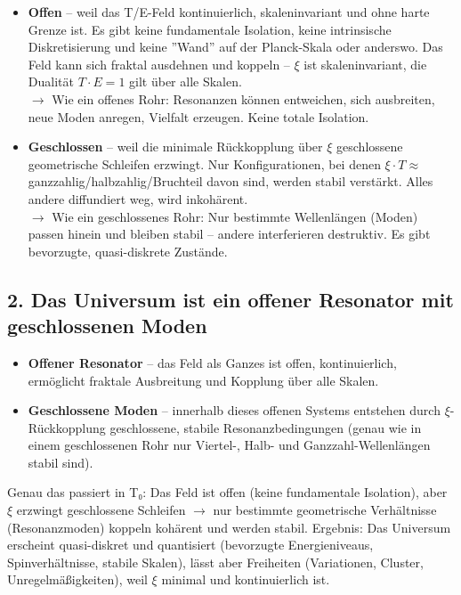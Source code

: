 \begin{itemize}[label=$\bullet$]
	\item \textbf{Offen} – weil das T/E-Feld kontinuierlich, skaleninvariant und ohne harte Grenze ist. Es gibt keine fundamentale Isolation, keine intrinsische Diskretisierung und keine ''Wand'' auf der Planck-Skala oder anderswo. Das Feld kann sich fraktal ausdehnen und koppeln – $\xi$ ist skaleninvariant, die Dualität $T \cdot E = 1$ gilt über alle Skalen. \\
	$\rightarrow$ Wie ein offenes Rohr: Resonanzen können entweichen, sich ausbreiten, neue Moden anregen, Vielfalt erzeugen. Keine totale Isolation.
	
	\item \textbf{Geschlossen} – weil die minimale Rückkopplung über $\xi$ geschlossene geometrische Schleifen erzwingt. Nur Konfigurationen, bei denen $\xi \cdot T \approx$ ganzzahlig/halbzahlig/Bruchteil davon sind, werden stabil verstärkt. Alles andere diffundiert weg, wird inkohärent. \\
	$\rightarrow$ Wie ein geschlossenes Rohr: Nur bestimmte Wellenlängen (Moden) passen hinein und bleiben stabil – andere interferieren destruktiv. Es gibt bevorzugte, quasi-diskrete Zustände.
\end{itemize}

\subsection*{2. Das Universum ist ein offener Resonator mit geschlossenen Moden}

\begin{itemize}[label=$\bullet$]
	\item \textbf{Offener Resonator} – das Feld als Ganzes ist offen, kontinuierlich, ermöglicht fraktale Ausbreitung und Kopplung über alle Skalen.
	\item \textbf{Geschlossene Moden} – innerhalb dieses offenen Systems entstehen durch $\xi$-Rückkopplung geschlossene, stabile Resonanzbedingungen (genau wie in einem geschlossenen Rohr nur Viertel-, Halb- und Ganzzahl-Wellenlängen stabil sind).
\end{itemize}

Genau das passiert in T₀: Das Feld ist offen (keine fundamentale Isolation), aber $\xi$ erzwingt geschlossene Schleifen $\rightarrow$ nur bestimmte geometrische Verhältnisse (Resonanzmoden) koppeln kohärent und werden stabil. Ergebnis: Das Universum erscheint quasi-diskret und quantisiert (bevorzugte Energieniveaus, Spinverhältnisse, stabile Skalen), lässt aber Freiheiten (Variationen, Cluster, Unregelmäßigkeiten), weil $\xi$ minimal und kontinuierlich ist.

